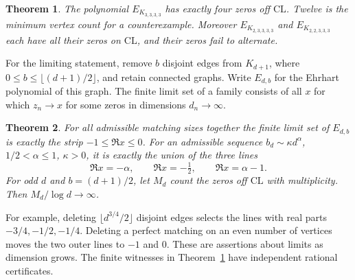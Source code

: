 \documentclass[11pt,a4paper]{article}
\newtheorem{theorem}{Theorem}[section]
\theoremstyle{definition}\newtheorem{problem}[theorem]{Problem}
\begin{document}
\begin{theorem}\label{th:counter}
The polynomial $E_{K_{3,3,3,3}}$ has exactly four zeros off $\mathrm{CL}$. Twelve is the minimum vertex count for a counterexample. Moreover $E_{K_{2,3,3,3,3}}$ and $E_{K_{2,2,3,3,3}}$ each have all their zeros on $\mathrm{CL}$, and their zeros fail to alternate.
\end{theorem}

For the limiting statement, remove $b$ disjoint edges from $K_{d+1}$, where $0\le b\le\lfloor(d+1)/2\rfloor$, and retain connected graphs. Write $E_{d,b}$ for the Ehrhart polynomial of this graph. The finite limit set of a family consists of all $x$ for which $z_n\to x$ for some zeros in dimensions $d_n\to\infty$.

\begin{theorem}\label{th:limit}
For all admissible matching sizes together the finite limit set of $E_{d,b}$ is exactly the strip $-1\le\Re x\le0$. For an admissible sequence $b_d\sim\kappa d^\alpha$, $1/2<\alpha\le1$, $\kappa>0$, it is exactly the union of the three lines
\[
 \Re x=-\alpha,\qquad \Re x=-\tfrac12,\qquad \Re x=\alpha-1.
\]
For odd $d$ and $b=(d+1)/2$, let $M_d$ count the zeros off $\mathrm{CL}$ with multiplicity. Then $M_d/\log d\to\infty$.
\end{theorem}

For example, deleting $\lfloor d^{3/4}/2\rfloor$ disjoint edges selects the lines with real parts $-3/4,-1/2,-1/4$. Deleting a perfect matching on an even number of vertices moves the two outer lines to $-1$ and $0$. These are assertions about limits as dimension grows. The finite witnesses in Theorem~\ref{th:counter} have independent rational certificates.
\end{document}
